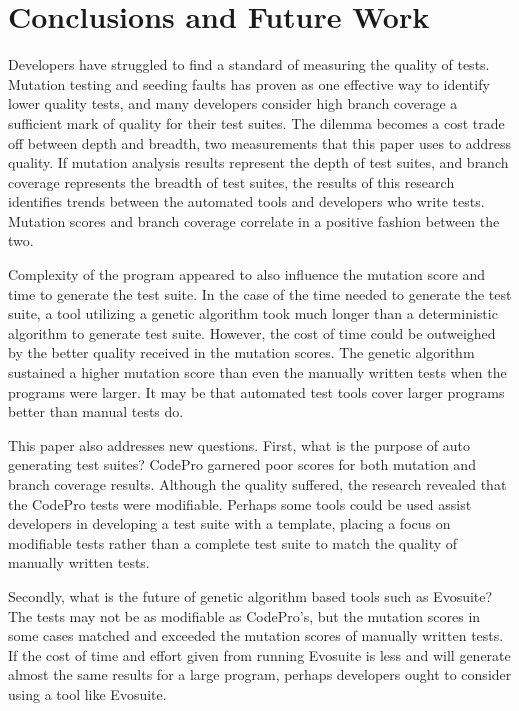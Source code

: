\section{Conclusions and Future Work}
\label{sec:conclusion}
Developers have struggled to find a standard of measuring the quality of tests. Mutation testing and seeding faults has proven as one effective way to identify lower quality tests, and many developers consider high branch coverage a sufficient mark of quality for their test suites. The dilemma becomes a cost trade off between depth and breadth, two measurements that this paper uses to address quality. If mutation analysis results represent the depth of test suites, and branch coverage represents the breadth of test suites, the results of this research identifies trends between the automated tools and developers who write tests. Mutation scores and branch coverage correlate in a positive fashion between the two.

Complexity of the program appeared to also influence the mutation score and time to generate the test suite. In the case of the time needed to generate the test suite, a tool utilizing a genetic algorithm took much longer than a deterministic algorithm to generate test suite. However, the cost of time could be outweighed by the better quality received in the mutation scores. The genetic algorithm sustained a higher mutation score than even the manually written tests when the programs were larger. It may be that automated test tools cover larger programs better than manual tests do.

This paper also addresses new questions. First, what is the purpose of auto generating test suites? CodePro garnered poor scores for both mutation and branch coverage results. Although the quality suffered, the research revealed that the CodePro tests were modifiable. Perhaps some tools could be used assist developers in developing a test suite with a template, placing a focus on modifiable tests rather than a complete test suite to match the quality of manually written tests.

Secondly, what is the future of genetic algorithm based tools such as Evosuite? The tests may not be as modifiable as CodePro's, but the mutation scores in some cases matched and exceeded the mutation scores of manually written tests. If the cost of time and effort given from running Evosuite is less and will generate almost the same results for a large program, perhaps developers ought to consider using a tool like Evosuite.

